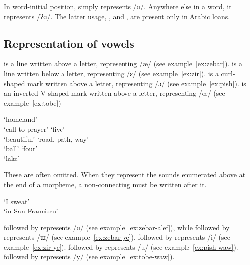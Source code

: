 In word-initial position,  simply represents /ɑ/.
Anywhere else in a word, it represents /ʔɑ/.
The latter usage, , and , are present only in Arabic loans.

\subsection{Representation of vowels}

  is a line written above a letter, representing /æ/ (see example~\ref{ex:zebar}).
  is a line written below a letter, representing /ɛ/ (see example~\ref{ex:zir}).
  is a curl-shaped mark written above a letter, representing /ɔ/ (see example~\ref{ex:pish}).
  is an inverted V-shaped mark written above a letter, representing /œ/ (see example~\ref{ex:tobe}).

\begin{lingexample}
	\ex \label{ex:zebar}   `homeland' \\
		  `call to prayer'
	\ex \label{ex:zir}   `five' \\
		  `beautiful'
	\ex \label{ex:pish}   `road, path, way' \\
		  `ball'
	\ex \label{ex:tobe}   `four' \\
		  `lake'
\end{lingexample}

These are often omitted.
When they represent the sounds enumerated above at the end of a morpheme, a non-connecting  must be written after it.

\begin{lingexample}
	\ex {}  `I sweat' \\
		  `in San Francisco'
\end{lingexample}

 followed by  represents /ɑ/ (see example~\ref{ex:zebar-alef}), while  followed by  represents /ɯ/ (see example~\ref{ex:zebar-ye}).
 followed by  represents /i/ (see example~\ref{ex:zir-ye}).
 followed by  represents /u/ (see example~\ref{ex:pish-waw}).
 followed by  represents /y/ (see example~\ref{ex:tobe-waw}).

